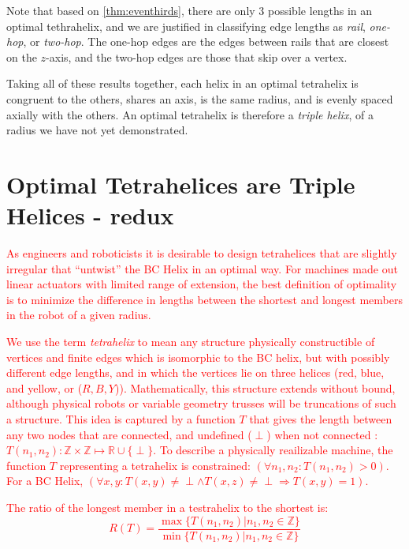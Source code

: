 \documentclass[twocolumn,10pt]{asme2ej}
\newcommand{\highlighttext}[1] {\textcolor{red}{#1}}
\begin{document}
 Note that based on \cref{thm:eventhirds}, there are only 3 possible lengths in an optimal tethrahelix,
 and we are justified in classifying edge lengths as \emph{rail}, \emph{one-hop}, or
\emph{two-hop}. The one-hop edges are the edges between rails that are closest on the $z$-axis, and the two-hop edges are those that skip over a vertex.


Taking all of these results together, 
each helix in an optimal tetrahelix is congruent to the others, shares an axis, is the same radius, and is evenly spaced
axially with the others.
An optimal tetrahelix is therefore a \emph{triple helix}, of a radius we have not yet demonstrated.

\section{Optimal Tetrahelices are Triple Helices - redux}

\highlighttext{
As engineers and roboticists it is desirable to design tetrahelices that
are slightly irregular that ``untwist'' the BC Helix in an optimal way.
For machines
made out linear actuators with limited range of extension,
the best definition of optimality is to minimize the difference in
lengths between the shortest and longest members in the robot of a given radius.
}

\highlighttext{
We use the term \emph{tetrahelix} to mean any structure physically constructible of
vertices and finite edges which is isomorphic to the BC helix, but with possibly different edge lengths,
and in which the
vertices lie on three helices (red, blue, and yellow, or ($R,B,Y$)). 
Mathematically, this structure extends
without bound, although physical robots or variable geometry trusses will
be truncations of such a structure.
This idea is captured by a function $T$ that gives the length between any
two nodes that are connected, and undefined ($\perp$) when not connected :
$T(n_1,n_2) : \mathbb{Z} \times \mathbb{Z} \mapsto \mathbb{R} \cup \{\perp\} $.
To describe a physically reailizable machine, the function $T$ representing a tetrahelix
is constrained:
$(\forall n_1,n_2 : T(n_1,n_2) > 0)$.
For a BC Helix, $(\forall x,y : T(x,y) \neq \perp \wedge T(x,z) \neq \perp \Rightarrow T(x,y) = 1)$.
}

\highlighttext{
The ratio of the longest member in a testrahelix to the shortest is:
\[
R(T) = \frac{\max \{T(n_1,n_2) | n_1,n_2 \in \mathbb{Z} \}}{\min \{T(n_1,n_2) | n_1,n_2 \in \mathbb{Z} \}}
\]
}
\end{document}
